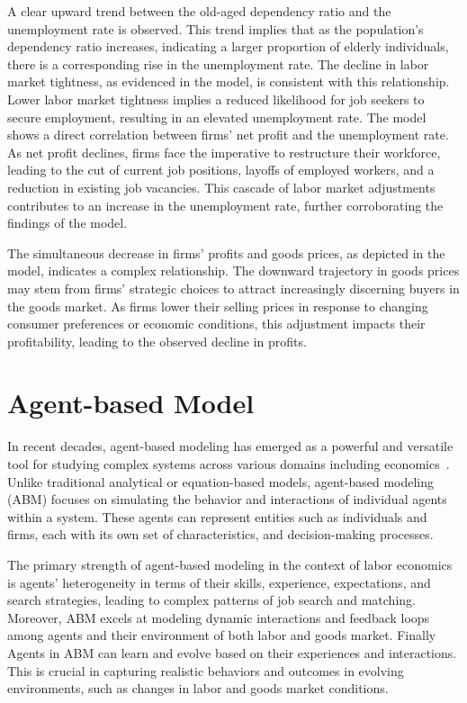 \documentclass[ %
    final,
    scrbook,
    listoffigures,
    listoftables, 
    glossary]{cu-thesis}
\begin{document}
A clear upward trend between the old-aged dependency ratio and the unemployment rate is
observed. This trend implies that as the population’s dependency ratio increases, indicating
a larger proportion of elderly individuals, there is a corresponding rise in the unemployment
rate. The decline in labor market tightness, as evidenced in the model, is consistent with this
relationship. Lower labor market tightness implies a reduced likelihood for job seekers to
secure employment, resulting in an elevated unemployment rate. The model shows a direct
correlation between firms’ net profit and the unemployment rate. As net profit declines,
firms face the imperative to restructure their workforce, leading to the cut of current job
positions, layoffs of employed workers, and a reduction in existing job vacancies. This cascade
of labor market adjustments contributes to an increase in the unemployment rate, further
corroborating the findings of the model.

The simultaneous decrease in firms’ profits and goods prices, as depicted in the model,
indicates a complex relationship. The downward trajectory in goods prices may stem from
firms’ strategic choices to attract increasingly discerning buyers in the goods market. As
firms lower their selling prices in response to changing consumer preferences or economic
conditions, this adjustment impacts their profitability, leading to the observed decline in
profits.

\chapter{Agent-based Model}
In recent decades, agent-based modeling has emerged as a powerful and versatile tool for
studying complex systems across various domains including economics~\cite{windrum2009consumer, silverman2013demography, axtell2016120}. Unlike
traditional analytical or equation-based models, agent-based modeling (ABM) focuses on
simulating the behavior and interactions of individual agents within a system. These agents
can represent entities such as individuals and firms, each with its own set of characteristics,
and decision-making processes.

The primary strength of agent-based modeling in the context of labor economics is agents’
heterogeneity in terms of their skills, experience, expectations, and search strategies, leading
to complex patterns of job search and matching. Moreover, ABM excels at modeling dynamic
interactions and feedback loops among agents and their environment of both labor and
goods market. Finally Agents in ABM can learn and evolve based on their experiences
and interactions. This is crucial in capturing realistic behaviors and outcomes in evolving
environments, such as changes in labor and goods market conditions.
\end{document}

